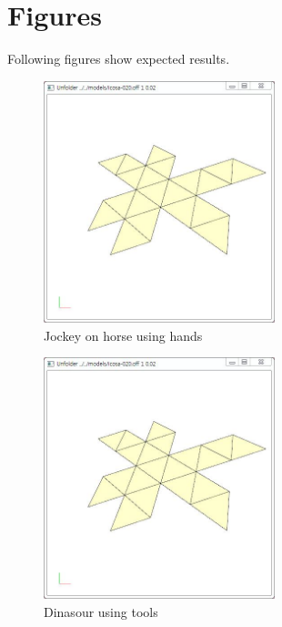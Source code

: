 \documentclass[11pt, letterpaper]{article}
\begin{document}
\section{Figures}
Following figures show expected results.

\begin{figure}[th]
\centering
\includegraphics[width=0.6\textwidth]{FIGS/icosa-020.jpg}
\caption{Jockey on horse using hands}
\label{fig:jocky-on-horse}
\end{figure}

\begin{figure}[th]
\centering
\includegraphics[width=0.6\textwidth]{FIGS/icosa-020.jpg}
\caption{Dinasour using tools}
\label{fig:dinasour}
\end{figure}
\end{document}
